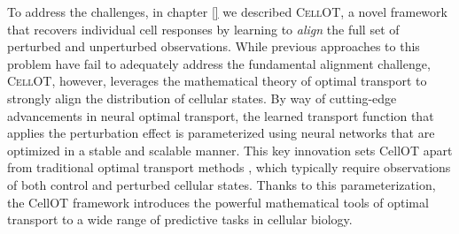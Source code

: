 To address the challenges, in chapter \ref{} we described \textsc{CellOT}, a novel framework that recovers individual cell responses by learning to \emph{align} the full set of perturbed and unperturbed observations. 
While previous approaches to this problem have fail to adequately address the fundamental alignment challenge,
\textsc{CellOT}, however, leverages the mathematical theory of optimal transport to strongly align the distribution of cellular states.
By way of cutting-edge advancements in neural optimal transport, the learned transport function that applies the perturbation effect is parameterized using neural networks that are optimized in a stable and scalable manner.
This key innovation sets CellOT apart from traditional optimal transport methods \cite{}, which typically require observations of both control and perturbed cellular states.
Thanks to this parameterization, the CellOT framework introduces the powerful mathematical tools of optimal transport to a wide range of predictive tasks in cellular biology.


